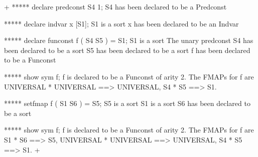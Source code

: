 



\gfexample+
   ***** declare predconst S4 1;
   S4 has been declared to be a Predconst

   ***** declare indvar x [S1];
   S1 is a sort
   x has been declared to be an Indvar

   ***** declare funconst f ( S4 S5 ) = S1;
   S1 is a sort
   The unary predconst S4 has been declared to be a sort
   S5 has been declared to be a sort
   f has been declared to be a Funconst
   
   ***** show sym f;
   f is declared to be a Funconst of arity 2.
   The FMAPs for f are
      UNIVERSAL * UNIVERSAL ==> UNIVERSAL,
      S4        * S5        ==> S1.

   ***** setfmap f ( S1 S6 ) = S5;
   S5 is a sort
   S1 is a sort
   S6 has been declared to be a sort

   ***** show sym f;
   f is declared to be a Funconst of arity 2.
   The FMAPs for f are
      S1        * S6        ==> S5,
      UNIVERSAL * UNIVERSAL ==> UNIVERSAL,
      S4        * S5        ==> S1.
+

